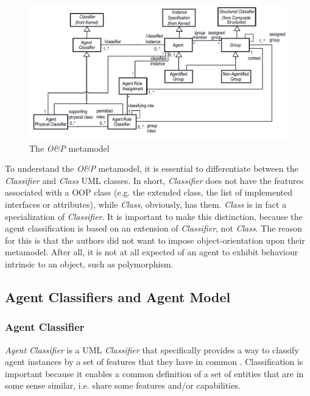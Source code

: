 \begin{figure}[ht]
	\centering
	\includegraphics[width=\textwidth]{images/onp/onp-metamodel.png}
	\caption{The \textit{O\&P} metamodel \cite{Odell05}}
	\label{figure:onp-metamodel}
\end{figure}

To understand the \textit{O\&P} metamodel, it is essential to differentiate between the \textit{Classifier} and \textit{Class} UML classes.
In short, \textit{Classifier} does not have the features associated with a OOP class (e.g. the extended class, the list of implemented interfaces or attributes), while \textit{Class}, obviously, has them.
\textit{Class} is in fact a specialization of \textit{Classifier}.
It is important to make this distinction, because the agent classification is based on an extension of \textit{Classifier}, not \textit{Class}.
The reason for this is that the authors did not want to impose object-orientation upon their metamodel.
After all, it is not at all expected of an agent to exhibit behaviour intrinsic to an object, such as polymorphism.

\subsection{Agent Classifiers and Agent Model}

\subsubsection*{Agent Classifier}

\textit{Agent Classifier} is a UML \textit{Classifier} that specifically provides a way to classify agent instances by a set of features that they have in common \cite{Odell05}.
Classification is important because it enables a common definition of a set of entities that are in some sense similar, i.e. share some features and/or capabilities.

